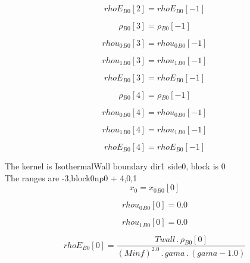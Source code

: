 \documentclass{article}
\begin{document}
\begin{dmath}{rhoE{_{B0}}}[{2}] = {rhoE{_{B0}}}[{-1}]\end{dmath}

\begin{dmath}{\rho{_{B0}}}[{3}] = {\rho{_{B0}}}[{-1}]\end{dmath}

\begin{dmath}{rhou_{0}{_{B0}}}[{3}] = {rhou_{0}{_{B0}}}[{-1}]\end{dmath}

\begin{dmath}{rhou_{1}{_{B0}}}[{3}] = {rhou_{1}{_{B0}}}[{-1}]\end{dmath}

\begin{dmath}{rhoE{_{B0}}}[{3}] = {rhoE{_{B0}}}[{-1}]\end{dmath}

\begin{dmath}{\rho{_{B0}}}[{4}] = {\rho{_{B0}}}[{-1}]\end{dmath}

\begin{dmath}{rhou_{0}{_{B0}}}[{4}] = {rhou_{0}{_{B0}}}[{-1}]\end{dmath}

\begin{dmath}{rhou_{1}{_{B0}}}[{4}] = {rhou_{1}{_{B0}}}[{-1}]\end{dmath}

\begin{dmath}{rhoE{_{B0}}}[{4}] = {rhoE{_{B0}}}[{-1}]\end{dmath}

\noindent The kernel is IsothermalWall boundary dir1 side0, block is 0\\\noindent The ranges are -3,block0np0 + 4,0,1\\\begin{dmath}x_{0} = {x_{0}{_{B0}}}[{0}]\end{dmath}

\begin{dmath}{rhou_{0}{_{B0}}}[{0}] = 0.0\end{dmath}

\begin{dmath}{rhou_{1}{_{B0}}}[{0}] = 0.0\end{dmath}

\begin{dmath}{rhoE{_{B0}}}[{0}] = \frac{Twall \,.\, {\rho{_{B0}}}[{0}]}{\left(Minf \right)^{2.0} \,.\, gama \,.\, \left(gama - 1.0\right)}\end{dmath}
\end{document}
